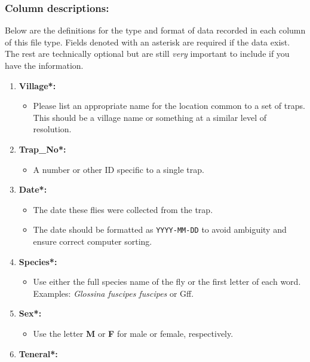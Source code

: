 \documentclass[letterpaper]{scrreprt}
\begin{document}
\subsubsection{Column descriptions:}\label{column-descriptions}

Below are the definitions for the type and format of data recorded in
each column of this file type. Fields denoted with an asterisk are
required if the data exist. The rest are technically optional but are
still \emph{very} important to include if you have the information.

\begin{enumerate}
\def\labelenumi{\Alph{enumi}.}
\itemsep1pt\parskip0pt
\item
  \textbf{Village*:}

  \begin{itemize}
  \itemsep1pt\parskip0pt
  \item
    Please list an appropriate name for the location common to a set of
    traps. This should be a village name or something at a similar level
    of resolution.
  \end{itemize}
\item
  \textbf{Trap\_No*:}

  \begin{itemize}
  \itemsep1pt\parskip0pt
  \item
    A number or other ID specific to a single trap.
  \end{itemize}
\item
  \textbf{Date*:}

  \begin{itemize}
  \itemsep1pt\parskip0pt
  \item
    The date these flies were collected from the trap.
  \item
    The date should be formatted as \texttt{YYYY-MM-DD} to avoid
    ambiguity and ensure correct computer sorting.
  \end{itemize}
\item
  \textbf{Species*:}

  \begin{itemize}
  \itemsep1pt\parskip0pt
  \item
    Use either the full species name of the fly or the first letter of
    each word. Examples: \emph{Glossina fuscipes fuscipes} or Gff.
  \end{itemize}
\item
  \textbf{Sex*:}

  \begin{itemize}
  \itemsep1pt\parskip0pt
  \item
    Use the letter \textbf{M} or \textbf{F} for male or female,
    respectively.
  \end{itemize}
\item
  \textbf{Teneral*:}


\end{enumerate}
\end{document}
